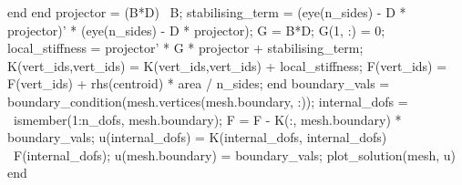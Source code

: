 \documentclass[../main.tex]{subfiles}
\begin{document}
		end
	end
	projector = (B*D) \ B; %
	stabilising_term = (eye(n_sides) - D * projector)' * (eye(n_sides) - D * projector);
	G = B*D; G(1, :) = 0;
	local_stiffness = projector' * G * projector + stabilising_term;
	K(vert_ids,vert_ids) = K(vert_ids,vert_ids) + local_stiffness; %
	F(vert_ids) = F(vert_ids) + rhs(centroid) * area / n_sides;
end
boundary_vals = boundary_condition(mesh.vertices(mesh.boundary, :));
internal_dofs = ~ismember(1:n_dofs, mesh.boundary); %
F = F - K(:, mesh.boundary) * boundary_vals; %
u(internal_dofs) = K(internal_dofs, internal_dofs) \ F(internal_dofs); %
u(mesh.boundary) = boundary_vals; %
plot_solution(mesh, u)
end
\end{document}
